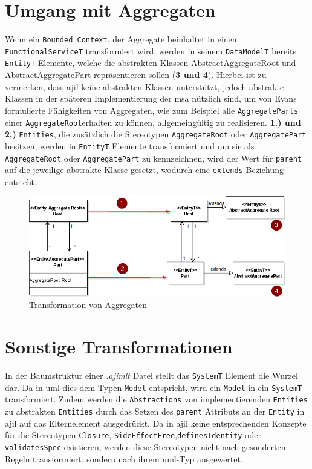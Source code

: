 \documentclass[
	oneside,  %
	ngerman, 
	final, 
	11pt, 
	a4paper, 
	1.1headlines, 
	headinclude=false, 
	footinclude=false, 
	mpinclude=false, 
	pagesize, 
	onecolumn, 
	titlepage, 
	parskip=half, 
	headsepline, 
	chapterprefix=false, 
	version=first, 
	listof=totoc, 
	bibliography=totoc, 
	toc=graduated, 
	fleqn
]{scrbook}
\begin{document}
\section{Umgang mit Aggregaten}
Wenn ein \texttt{Bounded Context}, der Aggregate beinhaltet in einen \texttt{FunctionalServiceT} transformiert wird,  werden in seinem \texttt{DataModelT} bereits \texttt{EntityT} Elemente, welche die abstrakten Klassen AbstractAggregateRoot und AbstractAggregatePart repräsentieren sollen (\textbf{3 und 4}). Hierbei ist zu vermerken, dass \ac{ajil} keine abstrakten Klassen unterstützt, jedoch abstrakte Klassen in der späteren Implementierung der \ac{msa} nützlich sind, um von Evans formulierte Fähigkeiten von Aggregaten, wie zum Beispiel alle \texttt{AggregateParts} einer \texttt{AggregateRoot}erhalten zu können, allgemeingültig zu realisieren. \textbf{1.) und 2.)} \texttt{Entities}, die zusätzlich die Stereotypen \texttt{AggregateRoot} oder \texttt{AggregatePart} besitzen, werden in \texttt{EntityT} Elemente transformiert und um sie als  \texttt{AggregateRoot} oder \texttt{AggregatePart} zu kennzeichnen, wird der Wert für \texttt{parent} auf die jeweilige abstrakte Klasse gesetzt, wodurch eine \texttt{extends} Beziehung entsteht.
\begin{figure}
\includegraphics[width=\textwidth]{Bilder/aggregates_rules_explained.png}
\caption{Transformation von Aggregaten}
\end{figure}
\section{Sonstige Transformationen}
In der Baumstruktur einer \textit{.ajimlt} Datei stellt das \texttt{SystemT} Element die Wurzel dar. Da in \ac{uml} dies dem Typen \texttt{Model} entspricht, wird ein \texttt{Model} in ein \texttt{SystemT} transformiert. Zudem werden die \texttt{Abstractions} von implementierenden \texttt{Entities} zu abstrakten \texttt{Entities} durch das Setzen des \texttt{parent} Attributs an der \texttt{Entity} in \ac{ajil} auf das Elternelement ausgedrückt. Da in \ac{ajil} keine entsprechenden Konzepte für die Stereotypen \texttt{Closure}, \texttt{SideEffectFree},\texttt{definesIdentity} oder \texttt{validatesSpec} existieren, werden diese Stereotypen nicht nach gesonderten Regeln transformiert, sondern nach ihrem \ac{uml}-Typ ausgewertet.
\end{document}
